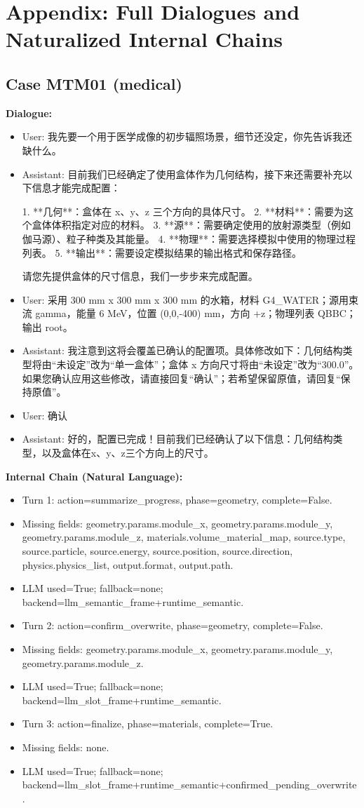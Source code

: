 \documentclass[11pt]{ctexart}
\begin{document}
\section{Appendix: Full Dialogues and Naturalized Internal Chains}
\subsection{Case MTM01 (medical)}
\textbf{Dialogue:}
\begin{itemize}
\item User: 我先要一个用于医学成像的初步辐照场景，细节还没定，你先告诉我还缺什么。
\item Assistant: 目前我们已经确定了使用盒体作为几何结构，接下来还需要补充以下信息才能完成配置：

1.  **几何**：盒体在 x、y、z 三个方向的具体尺寸。
2.  **材料**：需要为这个盒体体积指定对应的材料。
3.  **源**：需要确定使用的放射源类型（例如伽马源）、粒子种类及其能量。
4.  **物理**：需要选择模拟中使用的物理过程列表。
5.  **输出**：需要设定模拟结果的输出格式和保存路径。

请您先提供盒体的尺寸信息，我们一步步来完成配置。
\item User: 采用 300 mm x 300 mm x 300 mm 的水箱，材料 G4\_WATER；源用束流 gamma，能量 6 MeV，位置 (0,0,-400) mm，方向 +z；物理列表 QBBC；输出 root。
\item Assistant: 我注意到这将会覆盖已确认的配置项。具体修改如下：几何结构类型将由“未设定”改为“单一盒体”；盒体 x 方向尺寸将由“未设定”改为“300.0”。如果您确认应用这些修改，请直接回复“确认”；若希望保留原值，请回复“保持原值”。
\item User: 确认
\item Assistant: 好的，配置已完成！目前我们已经确认了以下信息：几何结构类型，以及盒体在x、y、z三个方向上的尺寸。
\end{itemize}
\textbf{Internal Chain (Natural Language):}
\begin{itemize}
\item Turn 1: action=summarize\_progress, phase=geometry, complete=False.
\item Missing fields: geometry.params.module\_x, geometry.params.module\_y, geometry.params.module\_z, materials.volume\_material\_map, source.type, source.particle, source.energy, source.position, source.direction, physics.physics\_list, output.format, output.path.
\item LLM used=True; fallback=none; backend=llm\_semantic\_frame+runtime\_semantic.
\item Turn 2: action=confirm\_overwrite, phase=geometry, complete=False.
\item Missing fields: geometry.params.module\_x, geometry.params.module\_y, geometry.params.module\_z.
\item LLM used=True; fallback=none; backend=llm\_slot\_frame+runtime\_semantic.
\item Turn 3: action=finalize, phase=materials, complete=True.
\item Missing fields: none.
\item LLM used=True; fallback=none; backend=llm\_slot\_frame+runtime\_semantic+confirmed\_pending\_overwrite.
\end{itemize}
\end{document}

